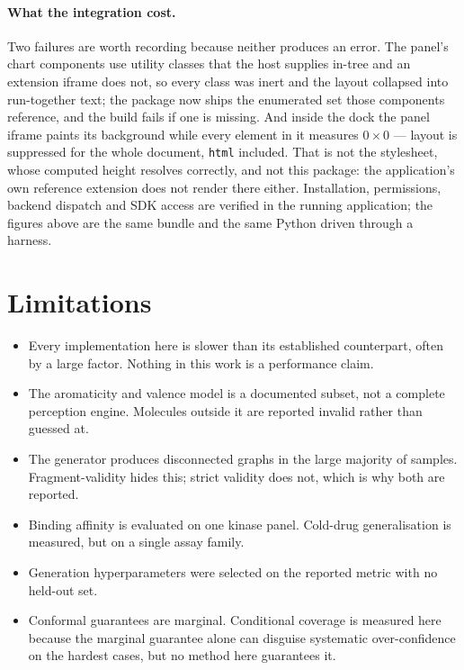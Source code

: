 \paragraph{What the integration cost.}
Two failures are worth recording because neither produces an error. The panel's
chart components use utility classes that the host supplies in-tree and an
extension iframe does not, so every class was inert and the layout collapsed
into run-together text; the package now ships the enumerated set those
components reference, and the build fails if one is missing. And inside the dock
the panel iframe paints its background while every element in it measures
$0 \times 0$ --- layout is suppressed for the whole document, \texttt{html}
included. That is not the stylesheet, whose computed height resolves correctly,
and not this package: the application's own reference extension does not render
there either. Installation, permissions, backend dispatch and SDK access are
verified in the running application; the figures above are the same bundle and
the same Python driven through a harness.

\section{Limitations}

\begin{itemize}\itemsep1pt
\item Every implementation here is slower than its established counterpart, often by
      a large factor. Nothing in this work is a performance claim.
\item The aromaticity and valence model is a documented subset, not a complete
      perception engine. Molecules outside it are reported invalid rather than
      guessed at.
\item The generator produces disconnected graphs in the large majority of samples.
      Fragment-validity hides this; strict validity does not, which is why both are
      reported.
\item Binding affinity is evaluated on one kinase panel. Cold-drug generalisation is
      measured, but on a single assay family.
\item Generation hyperparameters were selected on the reported metric with no
      held-out set.
\item Conformal guarantees are marginal. Conditional coverage is measured here
      because the marginal guarantee alone can disguise systematic
      over-confidence on the hardest cases, but no method here guarantees it.
\end{itemize}

